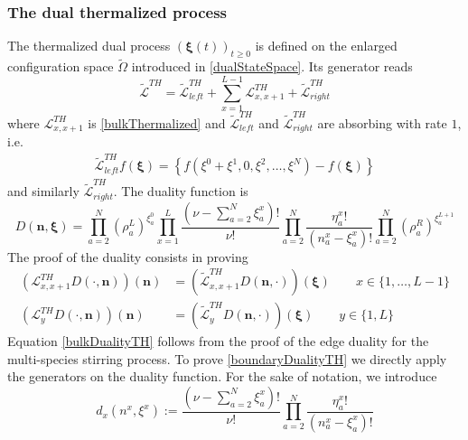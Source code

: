 \documentclass[10pt]{article}
\numberwithin{equation}{section}
\numberwithin{equation}{subsection}
\begin{document}
\subsubsection{The dual thermalized process}
The thermalized dual process $(\bm{\xi}(t))_{t\geq 0}$ is defined on the enlarged configuration space $\widetilde{\Omega}$ introduced in \eqref{dualStateSpace}. Its generator reads
\begin{equation}
		\widetilde{\mathcal{L}}^{TH}=\widetilde{\mathcal{L}}_{left}^{TH}+\sum_{x=1}^{L-1}\mathcal{L}_{x,x+1}^{TH}+\widetilde{\mathcal{L}}_{right}^{TH}
\end{equation}
where $\mathcal{L}^{TH}_{x,x+1}$ is \eqref{bulkThermalized} and $\widetilde{\mathcal{L}}_{left}^{TH}$ and $\widetilde{\mathcal{L}}_{right}^{TH}$ are absorbing with rate $1$, i.e. 
\begin{equation}
	\begin{split}
		\widetilde{\mathcal{L}}_{left}^{TH}f(\bm{\xi})=\left\{f(\xi^{0}+\xi^{1},0,\xi^{2},\ldots,\xi^{N})-f(\bm{\xi})\right\}
	\end{split}
\end{equation}
and similarly $\widetilde{\mathcal{L}}_{right}^{TH}$. 
The duality function is 
\begin{equation}
	D(\bm{n},\bm{\xi})=\prod_{a=2}^{N}\left(\rho_{a}^{L}\right)^{\xi_{a}^{0}}\prod_{x=1}^{L}\frac{(\nu-\sum_{a=2}^{N}\xi_{a}^{x})!}{\nu!}\prod_{a=2}^{N}\frac{\eta_{a}^{x}!}{(n_{a}^{x}-\xi_{a}^{x})!}\prod_{a=2}^{N}\left(\rho_{a}^{R}\right)^{\xi_{a}^{L+1}}
\end{equation}
The proof of the duality consists in proving 
\begin{align}
	\left(\mathcal{L}_{x,x+1}^{TH}D(\cdot,\bm{n})\right)(\bm{n})&=\left(\widetilde{\mathcal{L}}_{x,x+1}^{TH}D(\bm{n},\cdot)\right)(\bm{\xi})\qquad x\in \{1,\ldots,L-1\}\label{bulkDualityTH}\\
	\left(\mathcal{L}_{y}^{TH}D(\cdot,\bm{n})\right)(\bm{n})&=\left(\widetilde{\mathcal{L}}_{y}^{TH}D(\bm{n},\cdot)\right)(\bm{\xi})\qquad y\in\{1,L\}\label{boundaryDualityTH}
\end{align}
Equation \eqref{bulkDualityTH} follows from the proof of the edge duality for the multi-species stirring process. To prove \eqref{boundaryDualityTH} we directly apply the generators on the duality function. For the sake of notation, we introduce 
\begin{equation}
	d_{x}(n^{x},\xi^{x}):=\frac{(\nu-\sum_{a=2}^{N}\xi_{a}^{x})!}{\nu!}\prod_{a=2}^{N}\frac{\eta_{a}^{x}!}{(n_{a}^{x}-\xi_{a}^{x})!}
\end{equation}
\end{document}
